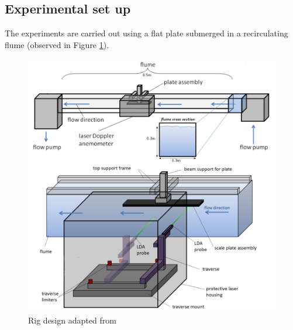 \documentclass[12pt,oneside,a4paper]{article}
\begin{document}
\subsection{Experimental set up}
\label{section:experiments:setUp}
The experiments are carried out using a flat plate submerged in a recirculating flume (observed in Figure \ref{figure:experiments:setUp}).
%
\begin{figure}[!b]
\centering
\includegraphics[width = 12cm]{images/LDA_theoryImages/expSetUp.png}
\caption{Rig design adapted from \cite{fletcher2014phd}}
\label{figure:experiments:setUp}
\end{figure}
%
\end{document}
